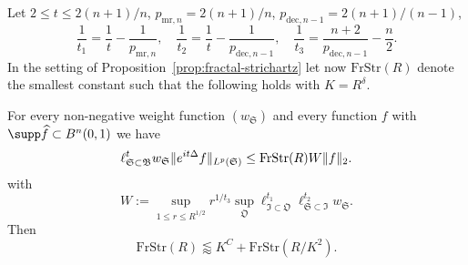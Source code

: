 \documentclass[biblatex]{pzorin-note}
\newcommand{\eit}{e^{i t \Delta}}
\newcommand{\FrStr}{\mathrm{FrStr}}
\newcommand{\bB}{\mathfrak{B}} %
\newcommand{\bS}{\mathfrak{S}} %
\newcommand{\bO}{\mathfrak{O}} %
\newcommand{\bI}{\mathfrak{I}} %
\begin{document}
\begin{proposition} \label{prop:fractal-strichartz2}
Let $2 \leq t \leq 2(n+1)/n$, $p_{\mathrm{mr},n}=2(n+1)/n$, $p_{\mathrm{dec},n-1}=2(n+1)/(n-1)$,
\[
\frac{1}{t_{1}} = \frac{1}{t} - \frac{1}{p_{\mathrm{mr},n}}, \quad
\frac{1}{t_{2}} = \frac{1}{t} - \frac{1}{p_{\mathrm{dec},n-1}}, \quad
\frac{1}{t_{3}} = \frac{n+2}{p_{\mathrm{dec},n-1}} - \frac{n}{2}.
\]
In the setting of Proposition~\ref{prop:fractal-strichartz} let now $\FrStr(R)$ denote the smallest constant such that the following holds with $K=R^{\delta}$.

For every non-negative weight function $(w_{\bS})$ and every function $f$ with $\supp \widehat{f}\subset B^n(0,1)$ we have
\begin{equation}\label{eq-main2}
\ell^{t}_{\bS \subset \bB} w_{\bS} \norm{ \eit f }_{L^{p}(\bS)}
\leq
\FrStr(R) W \norm{f}_2.
\end{equation}
with
\[
W := \sup_{1 \leq r \leq R^{1/2}} r^{1/t_{3}} \sup_{\bO} \ell^{t_{1}}_{\bI \subset \bO} \ell^{t_{2}}_{\bS \subset \bI} w_{\bS}.
\]
Then
\[
\FrStr(R) \lessapprox K^{C} + \FrStr(R/K^{2}).
\]
\end{proposition}
\end{document}
